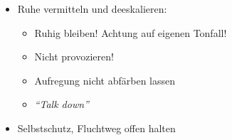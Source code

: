 \label{m:aggressiver-patient}%
%
\begin{itemize}
  \item Ruhe vermitteln und deeskalieren:
  \begin{itemize}
  \item  Ruhig bleiben! Achtung auf eigenen Tonfall!
  \item Nicht provozieren!
  \item Aufregung nicht abfärben lassen
  \item \emph{\enquote{Talk down}}
  \end{itemize}
  \item Selbstschutz, Fluchtweg offen halten
\end{itemize}